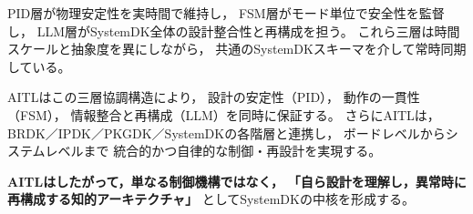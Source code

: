 PID層が物理安定性を実時間で維持し，
FSM層がモード単位で安全性を監督し，
LLM層がSystemDK全体の設計整合性と再構成を担う。
これら三層は時間スケールと抽象度を異にしながら，
共通のSystemDKスキーマを介して常時同期している。

AITLはこの三層協調構造により，
設計の安定性（PID），
動作の一貫性（FSM），
情報整合と再構成（LLM）を同時に保証する。
さらにAITLは，
BRDK／IPDK／PKGDK／SystemDKの各階層と連携し，
ボードレベルからシステムレベルまで
統合的かつ自律的な制御・再設計を実現する。

\textbf{AITLはしたがって，単なる制御機構ではなく，}
\textbf{「自ら設計を理解し，異常時に再構成する知的アーキテクチャ」}
としてSystemDKの中核を形成する。
